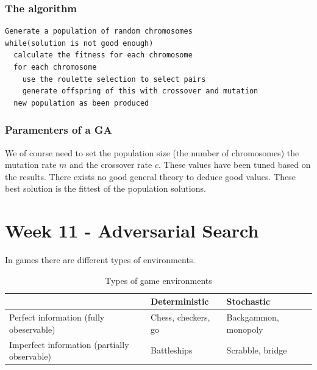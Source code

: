 \documentclass{article}
\begin{document}
\subsubsection{The algorithm}%
\label{ssub:the_algorithm}

\begin{lstlisting}[inputencoding=utf8/latin1, keywordstyle=\color{blue}\bfseries, rulecolor=\color{black}]
Generate a population of random chromosomes
while(solution is not good enough)
  calculate the fitness for each chromosome
  for each chromosome
    use the roulette selection to select pairs
    generate offspring of this with crossover and mutation
  new population as been produced
\end{lstlisting}


\subsubsection{Paramenters of a GA}%
\label{ssub:paramenters_of_a_ga}

We of course need to set the population size (the number of chromosomes) the
mutation rate $m$ and the crossover rate $c$.
These values have been tuned based on the results. There exists no good general
theory to deduce good values.
These best solution is the fittest of the population solutions.




\newpage

\section{Week 11 - Adversarial Search}%
\label{sub:_adversarial_search}

In games there are different types of environments.

\begin{table}[h]
  \centering
  \begin{tabular}{p{3.5cm}   l  l} 
     & \textbf{Deterministic}  & \textbf{Stochastic}  \\\midrule
    Perfect information \newline (fully obeservable) & Chess, checkers, go  &
    Backgammon, monopoly \\ \midrule
    Imperfect information \newline 
    (partially observable) & Battleships & Scrabble, bridge
  \end{tabular}
  \caption{Types of game environments}
  \label{tab:label}
\end{table}
\end{document}
